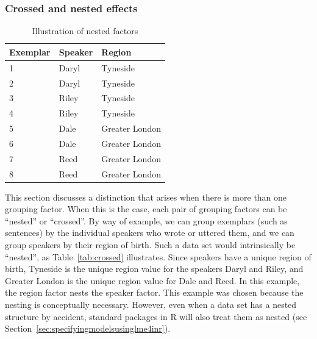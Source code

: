 \subsubsection{Crossed and nested effects}
\label{sec:crossedandnestedeffects}

\begin{table}
  \centering
  \begin{tabular}{lll}
    \toprule
    \textbf{Exemplar} & \textbf{Speaker}  & \textbf{Region}        \\
    \midrule
                    1 &           Daryl  &         Tyneside       \\
                    2 &           Daryl  &         Tyneside       \\
                    3 &           Riley  &         Tyneside       \\
                    4 &           Riley  &         Tyneside       \\
                    5 &           Dale   &         Greater London \\
                    6 &           Dale   &         Greater London \\
                    7 &           Reed   &         Greater London \\
                    8 &           Reed   &         Greater London \\
    \bottomrule
  \end{tabular}
  \caption{Illustration of nested factors}
  \label{tab:nested}
\end{table}

This section discusses a distinction that arises when there is more than one grouping factor.
When this is the case, each pair of grouping factors can be ``nested'' or ``crossed''.
By way of example, we can group exemplars (such as sentences) by the individual speakers who wrote or uttered them, and we can group speakers by their region of birth.
Such a data set would intrinsically be ``nested'', as Table~\ref{tab:crossed} illustrates.
Since speakers have a unique region of birth, Tyneside is the unique region value for the speakers Daryl and Riley, and Greater London is the unique region value for Dale and Reed.
In this example, the region factor nests the speaker factor.
This example was chosen because the nesting is conceptually necessary.
However, even when a data set has a nested structure by accident, standard packages in R will also treat them as nested (see Section~\ref{sec:specifyingmodelsusinglme4inr}).


